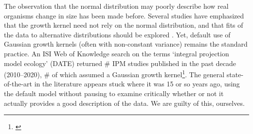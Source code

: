 \documentclass[11pt]{article}
\newcommand{\tom}[2]{{\color{red}{#1}}\footnote{\textit{\color{red}{#2}}}}
\begin{document}
{The observation that the normal distribution may poorly describe how real organisms change in size has been made before. 
Several studies have emphasized that the growth kernel need not rely on the normal distribution, and that fits of the data to alternative distributions should be explored \citep{easterling2000size,peterson2019improving,rees2014building,williams2012avoiding}. 
Yet, default use of Gaussian growth kernels (often with non-constant variance) remains the standard practice. 
An ISI Web of Knowledge search on the terms `integral projection model ecology' (DATE) returned \# IPM studies published in the past decade (2010--2020), \# of which assumed a Gaussian growth kernel\tom{}{Not sure if this is worth the trouble of doing, so I am just writing in placeholders for now. I think I know what I would find.}.
The general state-of-the-art in the literature appears stuck where it was 15 or so years ago, using the default model without pausing to examine critically whether or not it actually provides a good description of the data. 
We are guilty of this, ourselves. 

}
\end{document}
